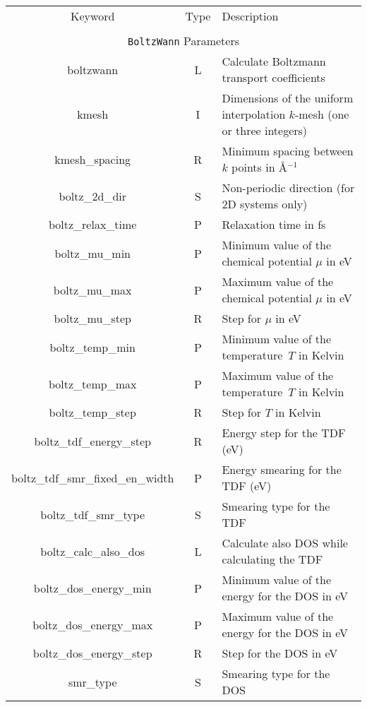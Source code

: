 \begin{table}[h!]
\begin{center}
\begin{tabular}{|c|c|p{6cm}|}
\hline
Keyword & Type & Description \\
        &      &             \\
\hline\hline
\multicolumn{3}{|c|}{{\tt BoltzWann} Parameters} \\
\hline
{\sc boltzwann}   & L & Calculate Boltzmann transport coefficients \\
{\sc [boltz\_]kmesh} & I & Dimensions of the uniform interpolation 
$k$-mesh (one or three integers)\\ 
{\sc [boltz\_]kmesh\_spacing} & R & Minimum spacing between $k$ points in \AA$^{-1}$\\
{\sc boltz\_2d\_dir} & S & Non-periodic direction (for 2D systems only)\\
{\sc boltz\_relax\_time} & P & Relaxation time in fs\\
{\sc boltz\_mu\_min} & P & Minimum value of the chemical potential $\mu$ in eV\\
{\sc boltz\_mu\_max} & P & Maximum value of the chemical potential $\mu$ in eV\\
{\sc boltz\_mu\_step} & R & Step for $\mu$ in eV\\
{\sc boltz\_temp\_min} & P & Minimum value of the temperature~$T$ in Kelvin \\
{\sc boltz\_temp\_max} & P & Maximum value of the temperature~$T$ in Kelvin \\
{\sc boltz\_temp\_step} & R & Step for $T$ in Kelvin \\
{\sc boltz\_tdf\_energy\_step} & R & Energy step for the TDF (eV) \\
{\sc boltz\_tdf\_smr\_fixed\_en\_width} & P & Energy smearing for the TDF (eV) \\
{\sc boltz\_tdf\_smr\_type} & S & Smearing type for the TDF \\
{\sc boltz\_calc\_also\_dos} & L & Calculate also DOS while calculating the TDF\\
{\sc boltz\_dos\_energy\_min} & P & Minimum value of the energy for the DOS in eV \\
{\sc boltz\_dos\_energy\_max} & P & Maximum value of the energy for the DOS in eV \\
{\sc boltz\_dos\_energy\_step} & R & Step for the DOS in eV\\
{smr\_type} & S & Smearing type for the DOS \\

\end{tabular}
\end{center}
\end{table}
